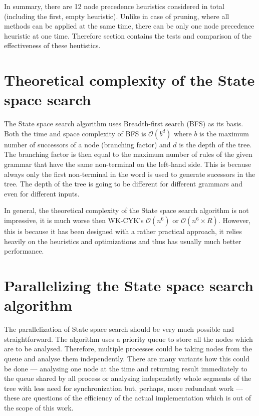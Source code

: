 \begin{enumerate}
In summary, there are 12 node precedence heuristics considered in total (including the first, empty heuristic). Unlike in case of pruning, where all methods can be applied at the same time, there can be only one node precedence heuristic at one time. Therefore section  contains the tests and comparison of the effectiveness of these heutistics.
\end{enumerate}

\section{Theoretical complexity of the State space search}
The State space search algorithm uses Breadth-first search (BFS) as its basis. Both the time and space complexity of BFS is $\mathcal{O}(b^d)$ where $b$ is the maximum number of successors of a node (branching factor) and $d$ is the depth of the tree. The branching factor is then equal to the maximum number of rules of the given grammar that have the same non-terminal on the left-hand side. This is because always only the first non-terminal in the word is used to generate sucessors in the tree. The depth of the tree is going to be different for different grammars and even for different inputs.

In general, the theoretical complexity of the State space search algorithm is not impressive, it is much worse then WK-CYK's $\mathcal{O}(n^6)$ or $\mathcal{O}(n^6 \times R)$. However, this is because it has been designed with a rather practical approach, it relies heavily on the heuristics and optimizations and thus has usually much better performance.

\section{Parallelizing the State space search algorithm}
The parallelization of State space search should be very much possible and straightforward. The algorithm uses a priority queue to store all the nodes which are to be analysed. Therefore, multiple processes could be taking nodes from the queue and analyse them independently. There are many variants how this could be done --- analysing one node at the time and returning result immediately to the queue shared by all process or analysing independetly whole segments of the tree with less need for synchronization but, perhaps, more redundant work --- these are questions of the efficiency of the actual implementation which is out of the scope of this work.

